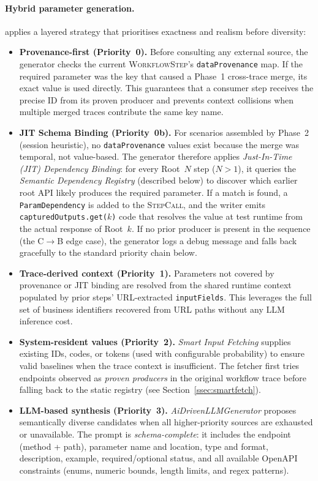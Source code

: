 \documentclass[conference]{IEEEtran}
\begin{document}
\paragraph{Hybrid parameter generation.}
 applies a layered strategy that prioritises exactness and realism before diversity:
\begin{itemize}[leftmargin=*]
  \item \textbf{Provenance-first (Priority~0).}  Before consulting any external source, the generator checks the current \textsc{WorkflowStep}'s \texttt{dataProvenance} map. If the required parameter was the key that caused a Phase~1 cross-trace merge, its exact value is used directly. This guarantees that a consumer step receives the precise ID from its proven producer and prevents context collisions when multiple merged traces contribute the same key name.
  \item \textbf{JIT Schema Binding (Priority~0b).}  For scenarios assembled by Phase~2 (session heuristic), no \texttt{dataProvenance} values exist because the merge was temporal, not value-based. The generator therefore applies \emph{Just-In-Time (JIT) Dependency Binding}: for every Root~$N$ step ($N > 1$), it queries the \emph{Semantic Dependency Registry} (described below) to discover which earlier root API likely produces the required parameter. If a match is found, a \texttt{ParamDependency} is added to the \textsc{StepCall}, and the writer emits \texttt{capturedOutputs.get($k$)} code that resolves the value at test runtime from the actual response of Root~$k$. If no prior producer is present in the sequence (the C$\to$B edge case), the generator logs a debug message and falls back gracefully to the standard priority chain below.
  \item \textbf{Trace-derived context (Priority~1).}  Parameters not covered by provenance or JIT binding are resolved from the shared runtime context populated by prior steps' URL-extracted \texttt{inputFields}. This leverages the full set of business identifiers recovered from URL paths without any LLM inference cost.
  \item \textbf{System-resident values (Priority~2).}  \emph{Smart Input Fetching} supplies existing IDs, codes, or tokens (used with configurable probability) to ensure valid baselines when the trace context is insufficient. The fetcher first tries endpoints observed as \emph{proven producers} in the original workflow trace before falling back to the static registry (see Section~\ref{ssec:smartfetch}).
  \item \textbf{LLM-based synthesis (Priority~3).}  \emph{AiDrivenLLMGenerator} proposes semantically diverse candidates when all higher-priority sources are exhausted or unavailable. The prompt is \emph{schema-complete}: it includes the endpoint (method + path), parameter name and location, type and format, description, example, required/optional status, and all available OpenAPI constraints (enums, numeric bounds, length limits, and regex patterns).
\end{itemize}
\end{document}
